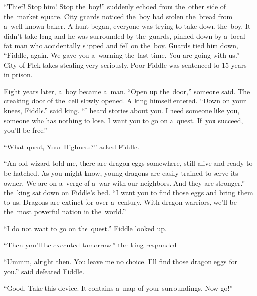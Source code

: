 “Thief! Stop him! Stop the~boy!” suddenly echoed from the~other side of the~market square. City guards noticed the~boy had stolen the~bread from a~well-known baker. A hunt began, everyone was trying to take down the~boy. It didn’t take long and he was surrounded by the~guards, pinned down by a~local fat man who accidentally slipped and fell on the~boy. Guards tied him down, “Fiddle, again. We gave you a~warning the~last time. You are going with us.” City of Flek takes stealing very seriously. Poor Fiddle was sentenced to 15 years in prison.

Eight years later, a~boy became a~man. “Open up the~door,” someone said. The creaking door of the~cell slowly opened. A king himself entered. “Down on your knees, Fiddle.” said king. “I heard stories about you. I need someone like you, someone who has nothing to lose. I want you to go on a~quest. If~you succeed, you’ll be free.”

“What quest, Your Highness?” asked Fiddle.

“An old wizard told me, there are dragon eggs somewhere, still alive and ready to be hatched. As you might know, young dragons are easily trained to serve its owner. We are on a~verge of a~war with our neighbors. And they are stronger.” the~king sat down on Fiddle’s bed. “I want you to find those eggs and bring them to us. Dragons are extinct for over a~century. With dragon warriors, we’ll be the~most powerful nation in the~world.”

“I do not want to go on the~quest.” Fiddle looked up.

“Then you’ll be executed tomorrow.” the~king responded

“Ummm, alright then. You leave me no choice. I’ll find those dragon eggs for you.” said defeated Fiddle.

“Good. Take this device. It contains a~map of your surroundings. Now go!”
